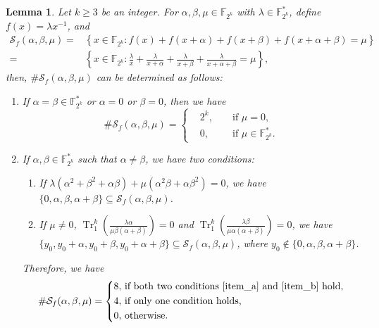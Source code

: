 \documentclass{article}
\newcommand{\F}{\mathbb{F}}
\newcommand{\0}{\textbf{0}}
\newcommand{\1}{\textbf{1}}
\newcommand{\TRACE}{\operatorname{Tr}_1^k}
\theoremstyle{plain}
\newtheorem{lemma}{Lemma}
\begin{document}
    \begin{lemma}\label{lemma:num_sol_second_dev}
        Let $k\ge 3$ be an integer.
        For $\alpha,\beta,\mu\in\F_{2^k}$ with $\lambda\in\F_{2^k}^*$, define $f(x)=\lambda x^{-1}$, and
        \begin{align*}
            \mathcal{S}_f(\alpha,\beta,\mu)=&\left\{x\in\F_{2^k} : f(x)+f(x+\alpha)+f(x+\beta)+f(x+\alpha+\beta)=\mu\right\}\\
            =&\left\{ x\in\F_{2^k} : \frac{\lambda}{x}+\frac{\lambda}{x+\alpha}+\frac{\lambda}{x+\beta}+\frac{\lambda}{x+\alpha+\beta}=\mu \right\},
        \end{align*}
        then, $\#\mathcal{S}_f(\alpha,\beta,\mu)$ can be determined as follows:
        \begin{enumerate}[label=(\arabic{*})]
            \item If $\alpha=\beta\in\F_{2^k}^*$ or $\alpha=0$ or $\beta=0$, then we have
            \[\#\mathcal{S}_f(\alpha,\beta,\mu) = \left\{
                \begin{alignedat}{2}
                    &2^k,&&\text{ if }\mu = 0,\\
                    &0,  &&\text{ if }\mu\in\F_{2^k}^*.
                \end{alignedat}\right.\]
            \item If $\alpha,\beta\in\F_{2^k}^*$ such that $\alpha\ne\beta$, we have two conditions:
            \begin{enumerate}[ref=(\alph{*})]
                \item If $\lambda(\alpha^2+\beta^2+\alpha\beta)+\mu(\alpha^2\beta+\alpha\beta^2)=0$, we have
                $\{0,\alpha,\beta,\alpha+\beta\}\subseteq\mathcal{S}_f(\alpha,\beta,\mu)$.\label{item_a}
                \item If $\mu\ne 0$, $\TRACE\left(\frac{\lambda\alpha}{\mu \beta(\alpha+\beta)}\right)=0$ and
                $\TRACE\left(\frac{\lambda \beta}{\mu \alpha(\alpha+\beta)}\right)=0$, we have
                $\{y_0,y_0+\alpha,y_0+\beta,y_0+\alpha+\beta\}\subseteq\mathcal{S}_f(\alpha,\beta,\mu)$, where $y_0\notin\{0,\alpha,\beta,\alpha+\beta\}$.\label{item_b}
            \end{enumerate}
            Therefore, we have
            \[\#\mathcal{S}_f(\alpha,\beta,\mu) = \left\{
                \begin{alignedat}{2}
                    &8,&&\text{ if both two conditions }\ref{item_a}\text{ and }\ref{item_b}\text{ hold,}\\
                    &4,&&\text{ if only one condition holds,}\\
                    &0,&&\text{ otherwise.}
                \end{alignedat}\right.\]
        \end{enumerate}
    \end{lemma}
\end{document}
